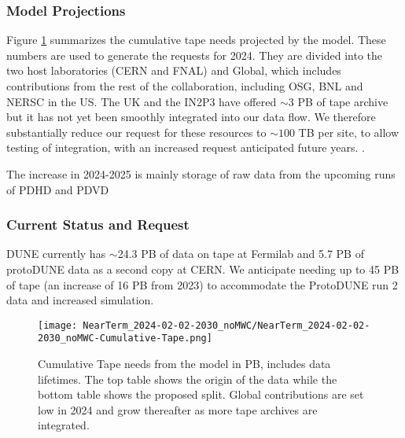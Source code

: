 \documentclass[12pt]{article}
\begin{document}
\subsubsection{Model Projections}

Figure  \ref{fig:Cumulative-Tape}  summarizes the cumulative  tape needs projected by  the model. These numbers are used to generate the requests for 2024.  They are divided into the two host laboratories (CERN and FNAL) and Global, which includes contributions from the rest of the collaboration, including OSG, BNL and NERSC in the US. 
The UK and the IN2P3 have offered $\sim 3$ PB of tape archive  but it has not yet been smoothly integrated into our data flow.  We  therefore substantially reduce our request for these resources to $\sim 100$ TB per site, to allow testing of integration, with an increased request anticipated future years. .

The increase in 2024-2025 is mainly storage of raw data from the upcoming runs of PDHD and PDVD



\subsubsection{Current Status and Request}\label{sec:taperesult}
DUNE currently has $\sim$24.3 PB of data on tape at Fermilab and 5.7 PB of protoDUNE data as a second copy at CERN.  We anticipate needing up to 45 PB of tape (an increase of 16 PB from 2023) to accommodate the ProtoDUNE run 2 data and increased simulation. 


\begin{figure}[h]
\centering\texttt{[image: NearTerm\_2024-02-02-2030\_noMWC/NearTerm\_2024-02-02-2030\_noMWC-Cumulative-Tape.png]}

\caption{Cumulative Tape needs from the model in PB, includes data lifetimes.  The top table shows the origin of the data while the bottom table  shows the proposed split.  Global contributions are set low in 2024 and grow thereafter as more tape archives are integrated. }\label{fig:Cumulative-Tape}
\end{figure}
\end{document}
